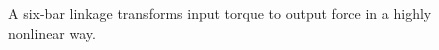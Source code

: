 \documentclass[journal]{IEEEtran}
\begin{document}
\begin{figure}[!t]
\centering
{}
\hfil
{}
\caption{A six-bar linkage transforms input torque to output force in a highly nonlinear way.}
\label{intro_sixbar}
\end{figure}
\end{document}
